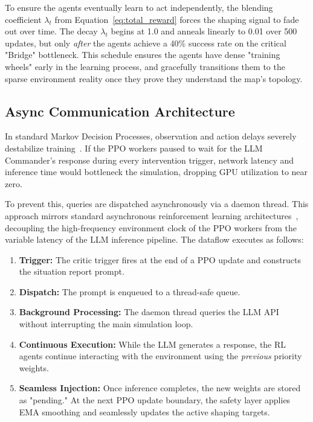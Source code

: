 To ensure the agents eventually learn to act independently, the blending coefficient $\lambda_t$ from Equation~\ref{eq:total_reward} forces the shaping signal to fade out over time. The decay $\lambda_t$ begins at 1.0 and anneals linearly to 0.01 over 500 updates, but only \emph{after} the agents achieve a 40\% success rate on the critical "Bridge" bottleneck. This schedule ensures the agents have dense "training wheels" early in the learning process, and gracefully transitions them to the sparse environment reality once they prove they understand the map's topology.

\subsection{Async Communication Architecture}
\label{sec:async_bridge}

In standard Markov Decision Processes, observation and action delays severely destabilize training~\parencite{Katsikopoulos_Engelbrecht_2003}. If the PPO workers paused to wait for the LLM Commander's response during every intervention trigger, network latency and inference time would bottleneck the simulation, dropping GPU utilization to near zero.

To prevent this, queries are dispatched asynchronously via a daemon thread. This approach mirrors standard asynchronous reinforcement learning architectures~\parencite[e.g.,][]{petrenko2020sample}, decoupling the high-frequency environment clock of the PPO workers from the variable latency of the LLM inference pipeline. The dataflow executes as follows:

\begin{enumerate}
    \item \textbf{Trigger:} The critic trigger fires at the end of a PPO update and constructs the situation report prompt.
    \item \textbf{Dispatch:} The prompt is enqueued to a thread-safe queue.
    \item \textbf{Background Processing:} The daemon thread queries the LLM API without interrupting the main simulation loop.
    \item \textbf{Continuous Execution:} While the LLM generates a response, the RL agents continue interacting with the environment using the \emph{previous} priority weights.
    \item \textbf{Seamless Injection:} Once inference completes, the new weights are stored as "pending." At the next PPO update boundary, the safety layer applies EMA smoothing and seamlessly updates the active shaping targets.
\end{enumerate}

